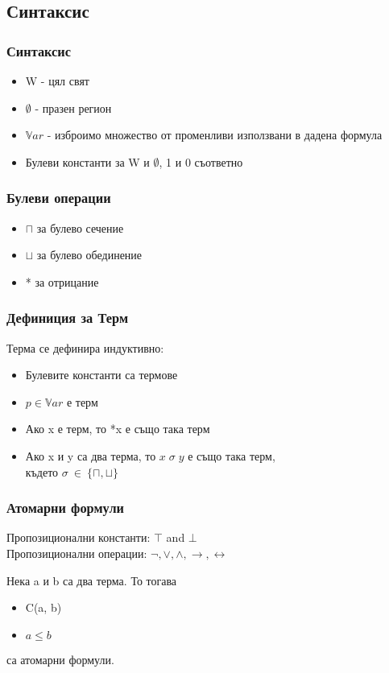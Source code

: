 \documentclass{beamer}
\begin{document}
\subsection{Синтаксис}
\begin{frame}\frametitle{Синтаксис}
	\begin{itemize}
		\item W - цял свят
		\item $\emptyset$ - празен регион
		\item $\mathbb{V}ar$ - изброимо множество от променливи използвани в дадена формула
		\item Булеви константи за W и $\emptyset$, 1 и 0 съответно
	\end{itemize}
\end{frame}

\begin{frame}\frametitle{Булеви операции}
	\begin{itemize}
		\item $\sqcap$ за булево сечение
		\item $\sqcup$ за булево обединение
		\item * за отрицание
	\end{itemize}
\end{frame}

\begin{frame}\frametitle{Дефиниция за Терм}
Терма се дефинира индуктивно:
	\begin{itemize}
		\item Булевите константи са термове
		\item $p \in \mathbb{V}ar$ е терм
		\item Ако x е терм, то *x е също така терм
		\item Ако x и y са два терма, то $x \; \sigma \; y $ е също така терм,\\
				където $\sigma \: \in \: \{\sqcap, \sqcup\}$
	\end{itemize}
\end{frame}

\begin{frame}\frametitle{Атомарни формули}
	Пропозиционални константи: $\top$ and $\bot$ \\
	\vspace{10px}
	Пропозиционални операции: $\neg, \vee, \wedge, \rightarrow, \leftrightarrow$
	\vspace{10px}

	Нека a и b са два терма. То тогава 
	\begin{itemize}
		\item C(a, b)
		\item $a \le b$
	\end{itemize}
	са атомарни формули.
\end{frame}
\end{document}
